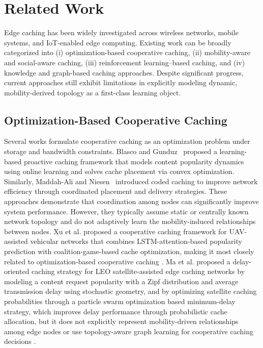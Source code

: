 \section{Related Work}

Edge caching has been widely investigated across wireless networks, mobile systems, and IoT-enabled edge computing. Existing work can be broadly categorized into (i) optimization-based cooperative caching, (ii) mobility-aware and social-aware caching, (iii) reinforcement learning–based caching, and (iv) knowledge and graph-based caching approaches. Despite significant progress, current approaches still exhibit limitations in explicitly modeling dynamic, mobility-derived topology as a first-class learning object.

\subsection{Optimization-Based Cooperative Caching}

Several works formulate cooperative caching as an optimization problem under storage and bandwidth constraints. Blasco and Gunduz~\cite{Blasco2014} proposed a learning-based proactive caching framework that models content popularity dynamics using online learning and solves cache placement via convex optimization. Similarly, Maddah-Ali and Niesen~\cite{MaddahAli2014} introduced coded caching to improve network efficiency through coordinated placement and delivery strategies. These approaches demonstrate that coordination among nodes can significantly improve system performance. However, they typically assume static or centrally known network topology and do not adaptively learn the mobility-induced relationships between nodes. Xu et al. proposed a cooperative caching framework for UAV-assisted vehicular networks that combines LSTM-attention-based popularity prediction with coalition-game-based cache optimization, making it most closely related to optimization-based cooperative caching \cite{bai2025collaborative}. Ma et al. proposed a delay-oriented caching strategy for LEO satellite-assisted edge caching networks by modeling a content request popularity with a Zipf distribution and average transmission delay using stochastic geometry, and by optimizing satellite caching probabilities through a particle swarm optimization based minimum-delay strategy, which improves delay performance through probabilistic cache allocation, but it does not explicitly represent mobility-driven relationships among edge nodes or use topology-aware graph learning for cooperative caching decisions \cite{ma2025delay}.

